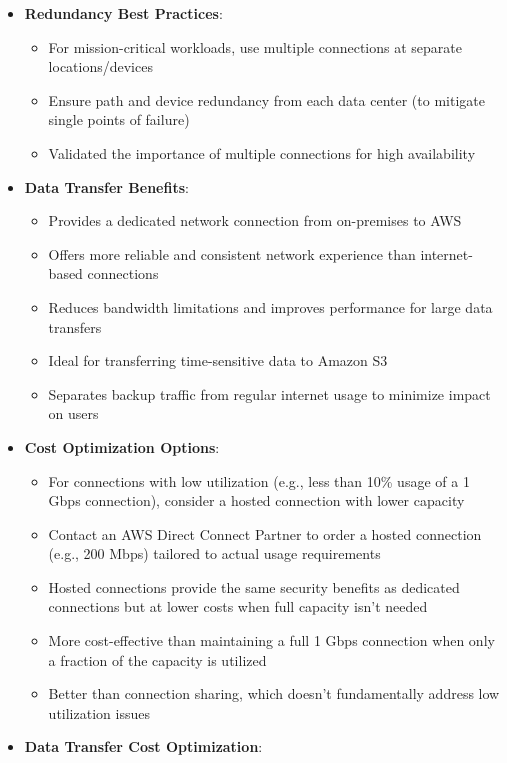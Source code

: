 \documentclass[11pt,a4paper]{report}
\begin{document}
\begin{itemize}
  \item \textbf{Redundancy Best Practices}:
\begin{itemize}
  \item For mission-critical workloads, use multiple connections at separate locations/devices
  \item Ensure path and device redundancy from each data center (to mitigate single points of failure)
  \item Validated the importance of multiple connections for high availability
\end{itemize}
  \item \textbf{Data Transfer Benefits}:
\begin{itemize}
  \item Provides a dedicated network connection from on-premises to AWS
  \item Offers more reliable and consistent network experience than internet-based connections
  \item Reduces bandwidth limitations and improves performance for large data transfers
  \item Ideal for transferring time-sensitive data to Amazon S3
  \item Separates backup traffic from regular internet usage to minimize impact on users
\end{itemize}
  \item \textbf{Cost Optimization Options}:
\begin{itemize}
  \item For connections with low utilization (e.g., less than 10\% usage of a 1 Gbps connection), consider a hosted connection with lower capacity
  \item Contact an AWS Direct Connect Partner to order a hosted connection (e.g., 200 Mbps) tailored to actual usage requirements
  \item Hosted connections provide the same security benefits as dedicated connections but at lower costs when full capacity isn't needed
  \item More cost-effective than maintaining a full 1 Gbps connection when only a fraction of the capacity is utilized
  \item Better than connection sharing, which doesn't fundamentally address low utilization issues
\end{itemize}
  \item \textbf{Data Transfer Cost Optimization}:
\begin{itemize}

\end{itemize}
\end{itemize}
\end{document}
